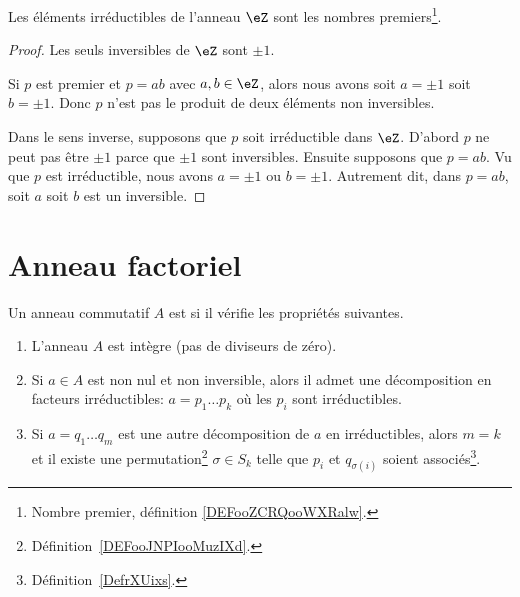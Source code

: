 \begin{proposition}     \label{PROPooKDWQooTtScrN}
    Les éléments irréductibles de l'anneau \( \eZ\) sont les nombres premiers\footnote{Nombre premier, définition \ref{DEFooZCRQooWXRalw}.}. 
\end{proposition}

\begin{proof}
    Les seuls inversibles de \( \eZ\) sont \( \pm 1\).

    Si \( p\) est premier et \( p=ab\) avec \( a,b\in \eZ\), alors nous avons soit \( a=\pm 1\) soit \( b=\pm 1\). Donc \( p\) n'est pas le produit de deux éléments non inversibles.

    Dans le sens inverse, supposons que \( p\) soit irréductible dans \( \eZ\). D'abord \( p\) ne peut pas être \( \pm 1\) parce que \( \pm 1\) sont inversibles. Ensuite supposons que \( p=ab\). Vu que \( p\) est irréductible, nous avons \( a=\pm1\) ou \( b=\pm1\). Autrement dit, dans \( p=ab\), soit \( a\) soit \( b\) est un inversible.
\end{proof}

\section{Anneau factoriel}

\begin{definition}        \label{DEFooVCATooPJGWKq}
	Un anneau commutatif \( A\) est  si il vérifie les propriétés suivantes.
	\begin{enumerate}
		\item
		      L'anneau \( A\) est intègre (pas de diviseurs de zéro).
		\item
		      Si \( a\in A\) est non nul et non inversible, alors il admet une décomposition en facteurs irréductibles: \( a=p_1\ldots p_k\) où les \( p_i\) sont irréductibles.
		\item
		      Si \( a=q_1\ldots q_m\) est une autre décomposition de \( a\) en irréductibles, alors \( m=k\) et il existe une permutation\footnote{Définition~\ref{DEFooJNPIooMuzIXd}.} \( \sigma\in S_k\) telle que \( p_i\) et \( q_{\sigma(i)}\) soient associés\footnote{Définition~\ref{DefrXUixs}.}.
	\end{enumerate}
\end{definition}

